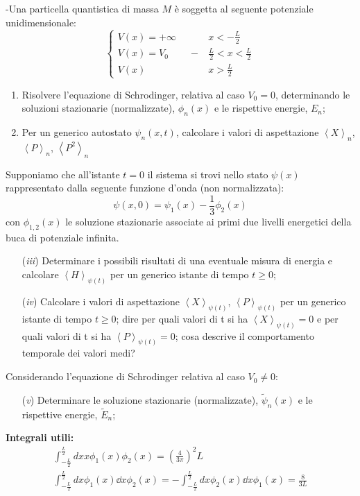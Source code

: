 \documentclass[12pt,twoside,a4]{article}
\begin{document}
\begin{esercizio}
-Una particella quantistica di massa $M$ è soggetta al seguente potenziale unidimensionale:
\begin{equation*}
	\begin{cases}
		V(x)=+\infty &x<-\frac{L}{2}\\
		V(x)=V_0 \hspace{25pt} -&\frac{L}{2}<x<\frac{L}{2}\\
		V(x) &x>\frac{L}{2}
	\end{cases}
\end{equation*}
\begin{enumerate}[label=(\textit{\roman*})]
	\item Risolvere l'equazione di Schrodinger, relativa al caso $V_0=0$, determinando le soluzioni stazionarie (normalizzate), $\phi_n(x)$ e le rispettive energie, $E_n$;
	\item Per un generico autostato $\psi_n(x,t)$, calcolare i valori di aspettazione $\left< X\right>_n$, $\left< P\right>_n$, $\left< P^2\right>_n$
\end{enumerate}
Supponiamo che all'istante $t=0$ il sistema si trovi nello stato $\psi(x)$ rappresentato dalla seguente funzione d'onda (non normalizzata):
\begin{equation*}
	\psi(x,0)=\psi_1(x) - \frac{1}{3} \phi_2(x)
\end{equation*}
con $\phi_{1,2}(x)$ le soluzione stazionarie associate ai primi due livelli energetici della buca di potenziale infinita.
\begin{enumerate}[label=(\textit{\roman*})]
	\item[(\textit{iii})] Determinare i possibili risultati di una eventuale misura di energia e calcolare $\left< H \right>_{\psi(t)}$ per un generico istante di tempo $t \geq 0$;
	\item[(\textit{iv})] Calcolare i valori di aspettazione $\left< X \right>_{\psi(t)}$, $\left< P \right>_{\psi(t)}$ per un generico istante di tempo $t \geq 0$; dire per quali valori di t si ha $\left< X \right>_{\psi(t)}=0$ e per quali valori di t si ha $\left< P \right>_{\psi(t)}=0$; cosa descrive il comportamento temporale dei valori medi?
\end{enumerate}
Considerando l'equazione di Schrodinger relativa al caso $V_0 \neq 0$:
\begin{enumerate}[label=(\textit{\roman*})]
	\item[(\textit{v})] Determinare le soluzione stazionarie (normalizzate), $\tilde \psi_n(x)$ e le rispettive energie, $\tilde E_n$;
\end{enumerate}
\textbf{Integrali utili:}
\begin{gather}
	\int_{-\frac{L}{2}}^{\frac{L}{2}}dx x \phi_1(x) \phi_2(x)= \left( \frac{4}{3 \pi} \right)^2L\\
	\int_{-\frac{L}{2}}^{\frac{L}{2}}dx \phi_1(x) \dd{}{x}\phi_2(x)= -\int_{-\frac{L}{2}}^{\frac{L}{2}}dx \phi_2(x) \dd{}{x}\phi_1(x)= \frac{8}{3L}\end{gather}
\end{esercizio}
\end{document}

